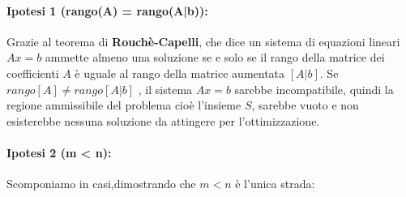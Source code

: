 \paragraph{Ipotesi 1 (rango(A) = rango(A|b)):} Grazie al teorema di \textbf{Rouchè-Capelli}, che dice
un sistema di equazioni lineari $Ax = b$ ammette almeno una soluzione se e solo se il rango della matrice dei coefficienti $A$ è uguale al rango della matrice aumentata $[A\vert{}b]$.
Se $rango[A] \neq rango[A\vert{}b]$ , il sistema $Ax = b$ sarebbe incompatibile, quindi la regione ammissibile del problema cioè l'insieme $S$, sarebbe vuoto e non esisterebbe nessuna soluzione da attingere per l'ottimizzazione.

\paragraph{Ipotesi 2 (m < n):} Scomponiamo in casi,dimostrando che $m < n$ è l'unica strada:
